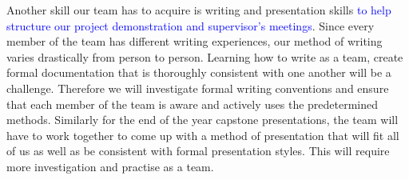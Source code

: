 \documentclass[12pt, titlepage]{article}
\begin{document}
\noindent Another skill our team has to acquire is writing and presentation skills \textcolor{blue}{to help structure our project demonstration and supervisor's meetings}. Since every member of the team has different writing experiences, our method of writing varies drastically from person to person. Learning how to write as a team, create formal documentation that is thoroughly consistent with one another will be a challenge. Therefore we will investigate formal writing conventions and ensure that each member of the team is aware and actively uses the predetermined methods. Similarly for the end of the year capstone presentations, the team will have to work together to come up with a method of presentation that will fit all of us as well as be consistent with formal presentation styles. This will require more investigation and practise as a team.\\



\end{document}
